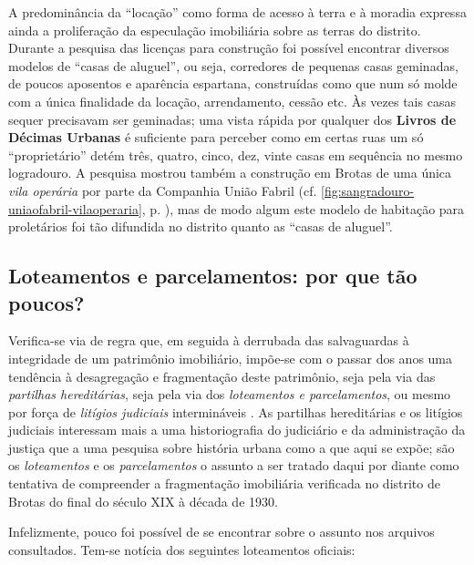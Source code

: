 A predominância da ``locação'' como forma de acesso à terra e à moradia expressa ainda a proliferação da especulação imobiliária sobre as terras do distrito. Durante a pesquisa das licenças para construção foi possível encontrar diversos modelos de ``casas de aluguel'', ou seja, corredores de pequenas casas geminadas, de poucos aposentos e aparência espartana, construídas como que num só molde com a única finalidade da locação, arrendamento, cessão etc. Às vezes tais casas sequer precisavam ser geminadas; uma vista rápida por qualquer dos \textbf{Livros de Décimas Urbanas} é suficiente para perceber como em certas ruas um só ``proprietário'' detém três, quatro, cinco, dez, vinte casas em sequência no mesmo logradouro. A pesquisa mostrou também a construção em Brotas de uma única \textit{vila operária} por parte da Companhia União Fabril (cf. \autoref{fig:sangradouro-uniaofabril-vilaoperaria}, p. \pageref{fig:sangradouro-uniaofabril-vilaoperaria}), mas de modo algum este modelo de habitação para proletários foi tão difundida no distrito quanto as ``casas de aluguel''.

\subsection{Loteamentos e parcelamentos: por que tão poucos?}\label{subsec:loteamentos}

Verifica-se via de regra que, em seguida à derrubada das salvaguardas à integridade de um patrimônio imobiliário, impõe-se com o passar dos anos uma tendência à desagregação e fragmentação deste patrimônio, seja pela via das \textit{partilhas hereditárias}, seja pela via dos \textit{loteamentos e parcelamentos}, ou mesmo por força de \textit{litígios judiciais} intermináveis \cite{costaporto_sesmaria_1980,sodero_diragrario_1990}. As partilhas hereditárias e os litígios judiciais interessam mais a uma historiografia do judiciário e da administração da justiça que a uma pesquisa sobre história urbana como a que aqui se expõe; são os \textit{loteamentos} e os \textit{parcelamentos} o assunto a ser tratado daqui por diante como tentativa de compreender a fragmentação imobiliária verificada no distrito de Brotas do final do século XIX à década de 1930.

Infelizmente, pouco foi possível de se encontrar sobre o assunto nos arquivos consultados. Tem-se notícia dos seguintes loteamentos oficiais:

